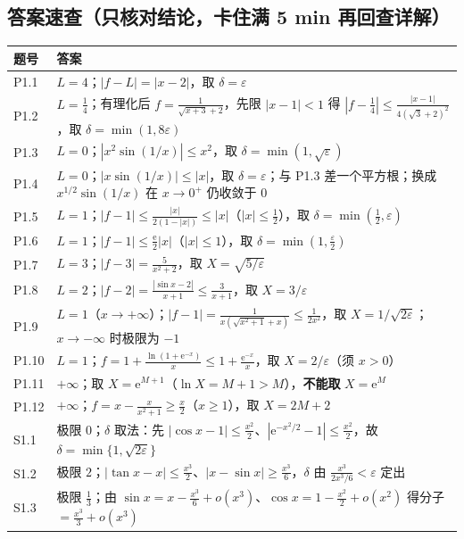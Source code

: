 \documentclass[11pt,a4paper]{ctexart}
\newcommand{\eps}{\varepsilon}
\newcommand{\abs}[1]{\left\lvert #1\right\rvert}
\newcommand{\ee}{\mathrm{e}}
\begin{document}
\subsection{答案速查（只核对结论，卡住满 5 min 再回查详解）}
{\footnotesize
\begin{longtable}{@{}p{1.5cm}p{13.6cm}@{}}
\toprule 题号 & 答案 \\ \midrule \endhead
\bottomrule \endlastfoot
P1.1 & $L=4$；$\abs{f-L}=\abs{x-2}$，取 $\delta=\eps$ \\
P1.2 & $L=\frac{1}{4}$；有理化后 $f=\frac{1}{\sqrt{x+3}+2}$，先限 $\abs{x-1}<1$ 得 $\abs{f-\frac{1}{4}}\le \frac{\abs{x-1}}{4(\sqrt{3}+2)^{2}}$，取 $\delta=\min(1,8\eps)$ \\
P1.3 & $L=0$；$\abs{x^{2}\sin(1/x)}\le x^{2}$，取 $\delta=\min(1,\sqrt{\eps})$ \\
P1.4 & $L=0$；$\abs{x\sin(1/x)}\le \abs{x}$，取 $\delta=\eps$；与 P1.3 差一个平方根；换成 $x^{1/2}\sin(1/x)$ 在 $x\to0^{+}$ 仍收敛于 0 \\
P1.5 & $L=1$；$\abs{f-1}\le \frac{\abs{x}}{2(1-\abs{x})}\le \abs{x}$（$\abs{x}\le\frac{1}{2}$），取 $\delta=\min(\frac{1}{2},\eps)$ \\
P1.6 & $L=1$；$\abs{f-1}\le \frac{\ee}{2}\abs{x}$（$\abs{x}\le 1$），取 $\delta=\min(1,\frac{\eps}{2})$ \\
P1.7 & $L=3$；$\abs{f-3}=\frac{5}{x^{2}+2}$，取 $X=\sqrt{5/\eps}$ \\
P1.8 & $L=2$；$\abs{f-2}=\frac{\abs{\sin x-2}}{x+1}\le \frac{3}{x+1}$，取 $X=3/\eps$ \\
P1.9 & $L=1$（$x\to+\infty$）；$\abs{f-1}=\frac{1}{x(\sqrt{x^{2}+1}+x)}\le\frac{1}{2x^{2}}$，取 $X=1/\sqrt{2\eps}$；$x\to-\infty$ 时极限为 $-1$ \\
P1.10 & $L=1$；$f=1+\frac{\ln(1+\ee^{-x})}{x}\le 1+\frac{\ee^{-x}}{x}$，取 $X=2/\eps$（须 $x>0$） \\
P1.11 & $+\infty$；取 $X=\ee^{M+1}$（$\ln X=M+1>M$），\textbf{不能取} $X=\ee^{M}$ \\
P1.12 & $+\infty$；$f=x-\frac{x}{x^{2}+1}\ge \frac{x}{2}$（$x\ge1$），取 $X=2M+2$ \\
S1.1 & 极限 $0$；$\delta$ 取法：先 $|\cos x-1|\leq\frac{x^{2}}{2}$、$|\ee^{-x^{2}/2}-1|\leq\frac{x^{2}}{2}$，故 $\delta=\min\{1,\sqrt{2\eps}\}$ \\
S1.2 & 极限 $2$；$\abs{\tan x-x}\leq\frac{x^{3}}{2}$、$\abs{x-\sin x}\geq\frac{x^{3}}{6}$，$\delta$ 由 $\frac{x^{3}}{2x^{3}/6}<\eps$ 定出 \\
S1.3 & 极限 $\frac13$；由 $\sin x=x-\frac{x^{3}}{6}+o(x^{3})$、$\cos x=1-\frac{x^{2}}{2}+o(x^{2})$ 得分子 $=\frac{x^{3}}{3}+o(x^{3})$ \\

\end{longtable}}
\end{document}
